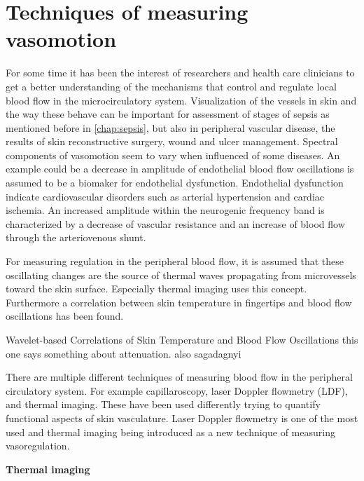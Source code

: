\section{Techniques of measuring vasomotion} \label{freq}

For some time it has been the interest of researchers and health care clinicians to get a better understanding of the mechanisms that control and regulate local blood flow in the microcirculatory system\cite{sagaidachnyi2014,sagaidachnyi2017,geyer2004,liu2012}. 
Visualization of the vessels in skin and the way these behave can be important for assessment of stages of sepsis as mentioned before in \cref{chap:sepsis}, but also in peripheral vascular disease, the results of skin reconstructive surgery, wound and ulcer management.\cite{liu2012,kanta2014}
Spectral components of vasomotion seem to vary when influenced of some diseases. An example could be a decrease in amplitude of endothelial blood flow oscillations is assumed to be a biomaker for endothelial dysfunction. Endothelial dysfunction indicate cardiovascular disorders such as arterial hypertension and cardiac ischemia. An increased amplitude within the neurogenic frequency band is characterized by a decrease of vascular resistance and an increase of blood flow through the arteriovenous shunt.\cite{sagaidachnyi2017}

For measuring regulation in the peripheral blood flow, it is assumed that these oscillating changes are the source of thermal waves propagating from microvessels toward the skin surface. Especially thermal imaging uses this concept.\cite{sagaidachnyi2017}
Furthermore a correlation between skin temperature in fingertips and blood flow oscillations has been found\cite{sagaidachnyi2014}.

{\Large Wavelet-based Correlations of Skin Temperature and Blood Flow
Oscillations this one says something about attenuation. 
also sagadagnyi }

There are multiple different techniques of measuring blood flow in the peripheral circulatory system. For example capillaroscopy, laser Doppler flowmetry (LDF), and thermal imaging. These have been used differently trying to quantify functional aspects of skin vasculature.\cite{liu2012} Laser Doppler flowmetry is one of the most used\cite{geyer2004} and thermal imaging being introduced as a new technique of measuring vasoregulation\cite{sagaidachnyi2014}.

\textbf{Thermal imaging}

